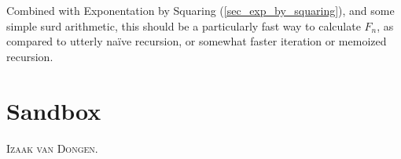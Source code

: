 \documentclass[fleqn,a4paper,11pt]{article}
\newcommand\omicron{o}
\begin{document}
    Combined with Exponentation by Squaring (\ref{sec_exp_by_squaring}), and
    some simple surd arithmetic, this should be a particularly fast way to
    calculate \(F_n\), as compared to utterly na\"ive recursion, or somewhat
    faster iteration or memoized recursion.

    \section{Sandbox}

    \lettrine{\color{RoyalBlue4}I}{zaak van Dongen}. \lipsum[1]

    \begin{center}
\end{center}
\end{document}
